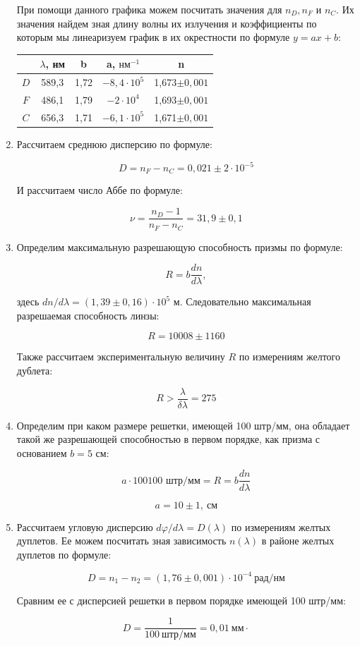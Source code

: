 \documentclass[a4paper, 12pt]{article}%
\begin{document}
\begin{enumerate}
При помощи данного графика можем посчитать значения для $n_D, n_F$ и $n_C$. Их значения найдем зная длину волны их излучения и коэффициенты по которым мы линеаризуем график в их окрестности по формуле $y = ax + b$:

\begin{center}
\begin{tabular}{|c|c|c|c|c|}
\hline 
 & $\lambda$, нм & b & a, $\text{нм}^{-1}$ & n \\ 
\hline 
$D$ & 589,3 & 1,72 & $-8,4\cdot 10^5$ & 1,673$\pm 0,001$ \\ 
\hline 
$F$ & 486,1 & 1,79 & $-2\cdot 10^4$ & 1,693$\pm 0,001$ \\ 
\hline 
$C$ & 656,3 & 1,71 & $-6,1\cdot 10^5$ & 1,671$\pm 0,001$ \\ 
\hline 
\end{tabular} 
\end{center}

\item Рассчитаем среднюю дисперсию по формуле:

\[D = n_F - n_C = 0,021 \pm 2\cdot 10^{-5}\]

И рассчитаем число Аббе по формуле:

\[\nu = \frac{n_D - 1}{n_F - n_C} = 31,9 \pm 0,1\]

\item Определим максимальную разрешающую способность призмы по формуле:

\[R = b \frac{dn}{d\lambda},\]

здесь $dn/d\lambda = (1,39 \pm 0,16) \cdot 10^5$ м. Следовательно максимальная разрешаемая способность линзы:

\[R = 10008 \pm 1160\]

Также рассчитаем экспериментальную величину $R$ по измерениям желтого дублета:

\[R > \frac{\lambda}{\delta\lambda} = 275\]

\item Определим при каком размере решетки, имеющей 100 штр/мм, она обладает такой же разрешающей способностью в первом порядке, как призма с основанием $b = 5$ см:

\[a \cdot 100 \text{100 штр/мм} = R = b \frac{dn}{d\lambda}\]

\[a = 10 \pm 1, \: \text{см}\]

\item Рассчитаем угловую дисперсию $d\varphi / d\lambda = D(\lambda )$ по измерениям желтых дуплетов. Ее можем посчитать зная зависимость $n(\lambda)$ в районе желтых дуплетов по формуле:

\[D = n_1 - n_2 = (1,76 \pm 0,001) \cdot 10^{-4} \: \text{рад/нм}\]

Сравним ее с дисперсией решетки в первом порядке имеющей 100 штр/мм:

\[D = \frac{1}{100 \: \text{штр/мм}} = 0,01 \: \text{мм}\cdot\]

\end{enumerate}
\end{document}
